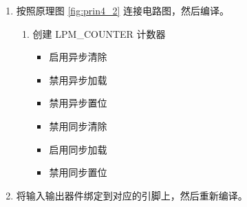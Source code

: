 \begin{enumerate}
    \item 按照原理图 \ref{fig:prin4_2} 连接电路图，然后编译。

    \begin{enumerate}
        \item 创建 LPM\_COUNTER 计数器
        
        \begin{itemize}
            \item 启用异步清除
            \item 禁用异步加载
            \item 禁用异步置位
            \item 禁用同步清除
            \item 启用同步加载
            \item 禁用同步置位
        \end{itemize}
        
    \end{enumerate}

    
    \item 将输入输出器件绑定到对应的引脚上，然后重新编译。
    

\end{enumerate}
